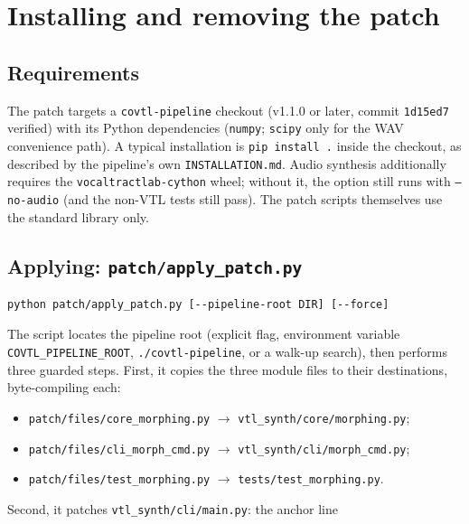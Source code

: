 \documentclass[11pt,a4paper]{article}
\newcommand{\code}[1]{\texttt{#1}}
\begin{document}
\section{Installing and removing the patch}\label{sec:install}

\subsection{Requirements}

The patch targets a \code{covtl-pipeline} checkout (v1.1.0 or later,
commit \code{1d15ed7} verified) with its Python dependencies
(\code{numpy}; \code{scipy} only for the WAV convenience path).  A
typical installation is \code{pip install .} inside the checkout, as
described by the pipeline's own \code{INSTALLATION.md}.  Audio
synthesis additionally requires the \code{vocaltractlab-cython}
wheel; without it, the option still runs with \code{--no-audio}
(and the non-VTL tests still pass).  The patch scripts themselves
use the standard library only.

\subsection{Applying: \code{patch/apply\_patch.py}}

\begin{lstlisting}[style=shell]
python patch/apply_patch.py [--pipeline-root DIR] [--force]
\end{lstlisting}

The script locates the pipeline root (explicit flag, environment
variable \code{COVTL\_PIPELINE\_ROOT}, \code{./covtl-pipeline}, or a
walk-up search), then performs three guarded steps.  First, it
copies the three module files to their destinations, byte-compiling
each:
\begin{itemize}[leftmargin=1.8em, itemsep=0pt]
\item \code{patch/files/core\_morphing.py} $\to$
\code{vtl\_synth/core/morphing.py};
\item \code{patch/files/cli\_morph\_cmd.py} $\to$
\code{vtl\_synth/cli/morph\_cmd.py};
\item \code{patch/files/test\_morphing.py} $\to$
\code{tests/test\_morphing.py}.
\end{itemize}
Second, it patches
\code{vtl\_synth/cli/main.py}: the anchor line
\end{document}
